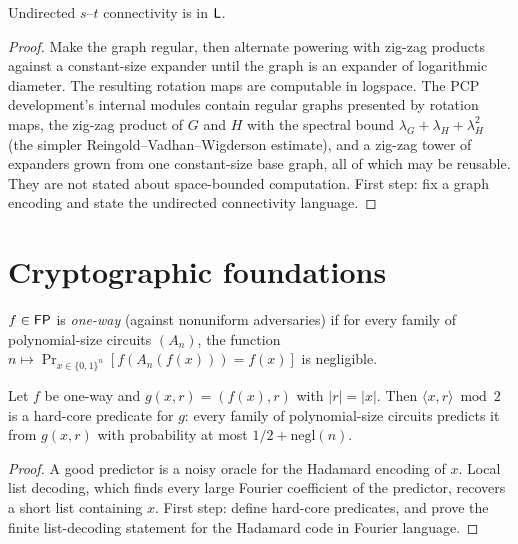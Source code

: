\begin{theorem}[Reingold: $\cc{SL} = \cc{L}$]
  \label{thm:frontiers-reingold}
  \notready
  Undirected $s$--$t$ connectivity is in $\mathsf{L}$.
\end{theorem}
\begin{proof}
  Make the graph regular, then alternate powering with zig-zag products against a
  constant-size expander until the graph is an expander of logarithmic diameter.
  The resulting rotation maps are computable in logspace. The PCP development's
  internal modules contain regular graphs presented by rotation maps, the
  zig-zag product of $G$ and $H$ with the spectral bound
  $\lambda_G + \lambda_H + \lambda_H^2$ (the simpler
  Reingold--Vadhan--Wigderson estimate), and a zig-zag tower of expanders
  grown from one constant-size base graph, all of which may be reusable. They
  are not stated about space-bounded computation. First step: fix a graph
  encoding and state the undirected connectivity language.
\end{proof}

\section{Cryptographic foundations}

\begin{definition}
  \label{def:frontiers-owf}
  $f \in \mathsf{FP}$ is \emph{one-way} (against nonuniform adversaries) if for every
  family of polynomial-size circuits $(A_n)$, the function
  $n \mapsto \Pr_{x \in \{0,1\}^n}[f(A_n(f(x))) = f(x)]$ is negligible.
\end{definition}

\begin{theorem}
  \label{thm:frontiers-goldreich-levin}
  \notready
  Let $f$ be one-way and $g(x, r) = (f(x), r)$ with $|r| = |x|$. Then
  $\langle x, r \rangle \bmod 2$ is a hard-core predicate for $g$: every family of
  polynomial-size circuits predicts it from $g(x,r)$ with probability at most
  $1/2 + \mathrm{negl}(n)$.
\end{theorem}
\begin{proof}
  A good predictor is a noisy oracle for the Hadamard encoding of $x$. Local list
  decoding, which finds every large Fourier coefficient of the predictor,
  recovers a short list containing $x$. First step: define hard-core predicates,
  and prove the finite list-decoding statement for the Hadamard code in Fourier
  language.
\end{proof}

